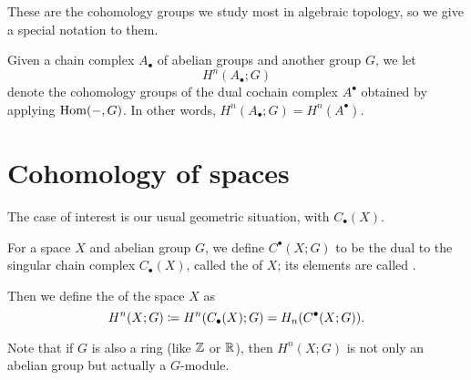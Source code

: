 These are the cohomology groups we study most in algebraic topology,
so we give a special notation to them.
\begin{definition}
	Given a chain complex $A_\bullet$ of abelian groups and another group $G$,
	we let \[ H^n(A_\bullet; G) \] denote the cohomology groups
	of the dual cochain complex $A^\bullet$ obtained by applying $\operatorname{Hom}(-,G)$.
	In other words, $H^n(A_\bullet; G) = H^n(A^\bullet)$.
\end{definition}

\section{Cohomology of spaces}

The case of interest is our usual geometric situation, with $C_\bullet(X)$.
\begin{definition}
	For a space $X$ and abelian group $G$,
	we define $C^\bullet(X;G)$ to be the dual to the
	singular chain complex $C_\bullet(X)$,
	called the  of $X$;
	its elements are called .

	Then we define the 
	of the space $X$ as 
	\[ H^n(X; G) \coloneqq H^n(C_\bullet(X); G) = H_n(C^\bullet(X;G)). \]
\end{definition}
\begin{remark}
	Note that if $G$ is also a ring (like $\mathbb Z$ or $\mathbb R$),
	then $H^n(X; G)$ is not only an abelian group but actually a $G$-module.
\end{remark}

